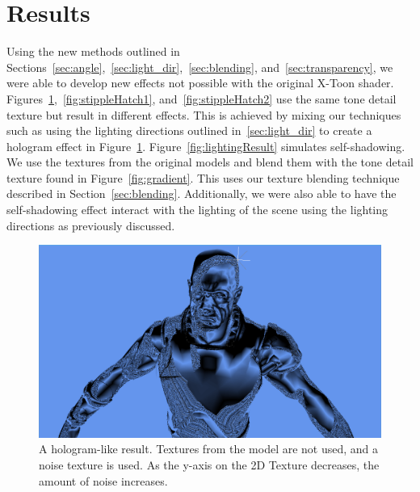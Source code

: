 \documentclass[annual]{acmsiggraph}
\begin{document}
\section{Results}
\label{sec:results}
Using the new methods outlined in Sections~\ref{sec:angle},~\ref{sec:light_dir},~\ref{sec:blending}, and~\ref{sec:transparency}, we were able to develop new effects not possible with the original X-Toon shader. Figures~\ref{fig:hologram},~\ref{fig:stippleHatch1}, and~\ref{fig:stippleHatch2} use the same tone detail texture but result in different effects. This is achieved by mixing our techniques such as using the lighting directions outlined in~\ref{sec:light_dir} to create a hologram effect in Figure~\ref{fig:hologram}. Figure~\ref{fig:lightingResult} simulates self-shadowing. We use the textures from the original models and blend them with the tone detail texture found in Figure~\ref{fig:gradient}. This uses our texture blending technique described in Section~\ref{sec:blending}. Additionally, we were also able to have the self-shadowing effect interact with the lighting of the scene using the lighting directions as previously discussed.

\begin{figure}[h]
	\centering
	\includegraphics[width=5.5in]{images/hologram}
	\caption{A hologram-like result. Textures from the model are not used, and a noise texture is used. As the y-axis on the 2D Texture decreases, the amount of noise increases.}
	\label{fig:hologram}
\end{figure}
\end{document}
